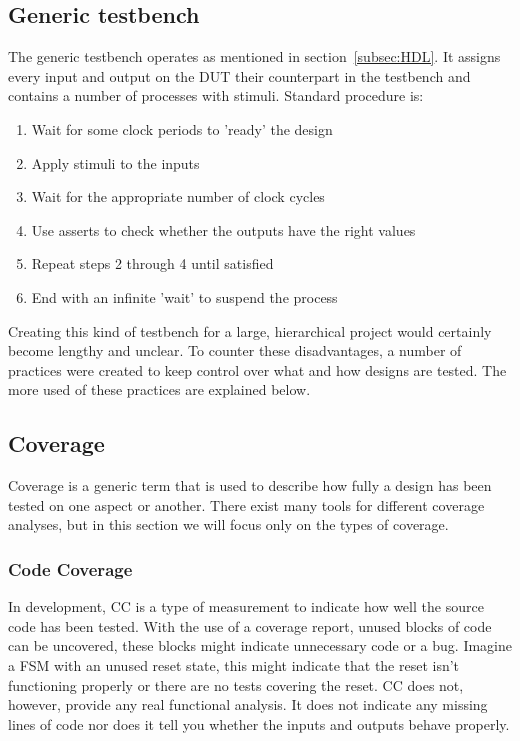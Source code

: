 \documentclass[11pt,british]{article}
\begin{document}
\subsection{Generic testbench}
The generic testbench operates as mentioned in section~\ref{subsec:HDL}. It assigns every input and output on the \gls{DUT} their counterpart in the testbench and contains a number of processes with stimuli. Standard procedure is:
\begin{enumerate}[itemsep=-0.1cm]
\item Wait for some clock periods to 'ready' the design
\item Apply stimuli to the inputs
\item Wait for the appropriate number of clock cycles
\item Use asserts to check whether the outputs have the right values
\item Repeat steps 2 through 4 until satisfied
\item End with an infinite 'wait' to suspend the process
\end{enumerate}
Creating this kind of testbench for a large, hierarchical project would certainly become lengthy and unclear. To counter these disadvantages, a number of practices were created to keep control over what and how designs are tested. The more used of these practices are explained below.

\subsection{Coverage}
Coverage is a generic term that is used to describe how fully a design has been tested on one aspect or another. There exist many tools for different coverage analyses, but in this section we will focus only on the types of coverage.

\subsubsection{Code Coverage}
In development, \gls{CC} is a type of measurement to indicate how well the source code has been tested. With the use of a coverage report, unused blocks of code can be uncovered, these blocks might indicate unnecessary code or a bug. Imagine a \gls{FSM} with an unused reset state, this might indicate that the reset isn't functioning properly or there are no tests covering the reset. CC does not, however, provide any real functional analysis. It does not indicate any missing lines of code nor does it tell you whether the inputs and outputs behave properly.
\end{document}
